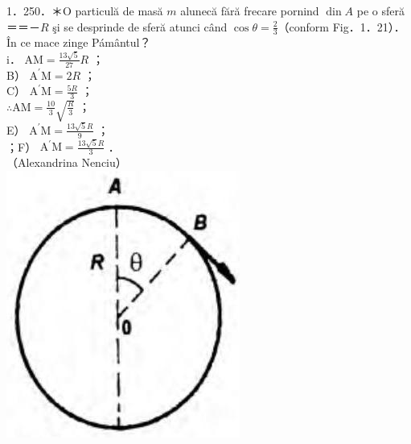 \documentclass[10pt]{article}
\begin{document}
1．250．＊O particulă de masă $m$ alunecă fără frecare pornind $\operatorname{din} A$ pe o sferă ＝＝－$R$ şi se desprinde de sferă atunci când $\cos \theta=\frac{2}{3}$（conform Fig．1．21）．În ce mace zinge Pámântul？\\
i． $\mathrm{AM}=\frac{13 \sqrt{5}}{27} R$ ；\\
B） $\mathrm{A}^{\prime} \mathrm{M}=2 R$ ；\\
C） $\mathrm{A}^{\prime} \mathrm{M}=\frac{5 R}{3}$ ；\\
$\therefore \mathrm{AM}=\frac{10}{3} \sqrt{\frac{R}{3}}$ ；\\
E） $\mathrm{A}^{\prime} \mathrm{M}=\frac{13 \sqrt{5} R}{9}$ ；\\
；F） $\mathrm{A}^{\prime} \mathrm{M}=\frac{13 \sqrt{5} R}{3}$ ．\\
（Alexandrina Nenciu）\\
\includegraphics[max width=\textwidth, center]{2025_07_01_5b3ff9fa0d508c8e9f17g-057(1)}
\end{document}
